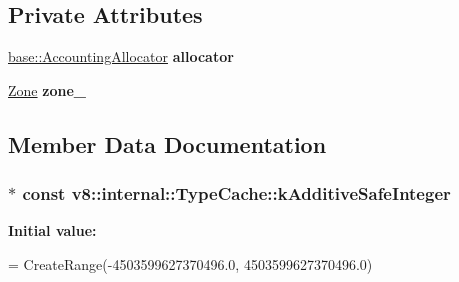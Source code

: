 \subsection*{Private Attributes}
\begin{DoxyCompactItemize}
\item 
\hyperlink{classv8_1_1base_1_1_accounting_allocator}{base\+::\+Accounting\+Allocator} {\bfseries allocator}\hypertarget{classv8_1_1internal_1_1_type_cache_aaf9f32eb1ba3cb20b511e0725f696104}{}\label{classv8_1_1internal_1_1_type_cache_aaf9f32eb1ba3cb20b511e0725f696104}

\item 
\hyperlink{classv8_1_1internal_1_1_zone}{Zone} {\bfseries zone\+\_\+}\hypertarget{classv8_1_1internal_1_1_type_cache_ab5782736e0dba41174fbe4c9b33842b9}{}\label{classv8_1_1internal_1_1_type_cache_ab5782736e0dba41174fbe4c9b33842b9}

\end{DoxyCompactItemize}


\subsection{Member Data Documentation}
\subsubsection[{\texorpdfstring{k\+Additive\+Safe\+Integer}{kAdditiveSafeInteger}}]{$\ast$ const v8\+::internal\+::\+Type\+Cache\+::k\+Additive\+Safe\+Integer}\hypertarget{classv8_1_1internal_1_1_type_cache_aaf4e23907ea31777298ca7a9245dc46b}{}\label{classv8_1_1internal_1_1_type_cache_aaf4e23907ea31777298ca7a9245dc46b}
{\bfseries Initial value\+:}
\begin{DoxyCode}
=
      CreateRange(-4503599627370496.0, 4503599627370496.0)
\end{DoxyCode}
